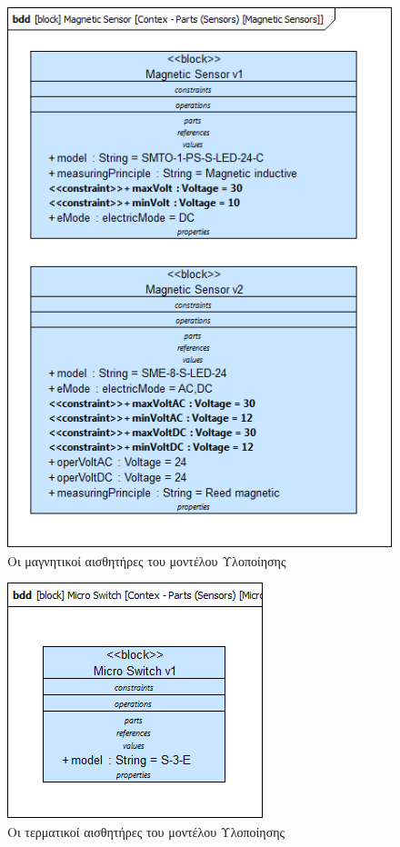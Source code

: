 \documentclass[a4paper,12pt,twoside]{report}
\begin{document}
\begin{appendices}
				\begin{figure}[hp]
					\centering
					\includegraphics[scale=0.50]{DesignModel_Contex-Parts(Sensors)[MagneticSensors].png}
					\caption{Οι μαγνητικοί αισθητήρες του μοντέλου Υλοποίησης}
					\label{φωτ:Οι μαγνητικοί αισθητήρες του μοντέλου Υλοποίησης}
				\end{figure}
				
				\begin{figure}[hp]
					\centering
					\includegraphics[scale=0.50]{DesignModel_Contex-Parts(Sensors)[MicroSwitch].png}
					\caption{Οι τερματικοί αισθητήρες του μοντέλου Υλοποίησης}
					\label{φωτ:Οι τερματικοί αισθητήρες του μοντέλου Υλοποίησης}
				\end{figure}
				

\end{appendices}
\end{document}
